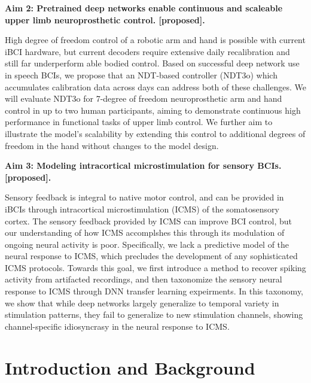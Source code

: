 \documentclass[12pt,oneside]{report}
\begin{document}
\textbf{Aim 2: Pretrained deep networks enable continuous and scaleable upper limb neuroprosthetic control. [proposed].}

High degree of freedom control of a robotic arm and hand is possible with current iBCI hardware, but current decoders require extensive daily recalibration and still far underperform able bodied control. Based on successful deep network use in speech BCIs, we propose that an NDT-based controller (NDT3o) which accumulates calibration data across days can address both of these challenges. We will evaluate NDT3o for 7-degree of freedom neuroprosthetic arm and hand control in up to two human participants, aiming to demonstrate continuous high performance in functional tasks of upper limb control. We further aim to illustrate the model’s scalability by extending this control to additional degrees of freedom in the hand without changes to the model design.

\textbf{Aim 3: Modeling intracortical microstimulation for sensory BCIs. [proposed].}

Sensory feedback is integral to native motor control, and can be provided in iBCIs through intracortical microstimulation (ICMS) of the somatosensory cortex. The sensory feedback provided by ICMS can improve BCI control, but our understanding of how ICMS accomplshes this through its modulation of ongoing neural activity is poor. Specifically, we lack a predictive model of the neural response to ICMS, which precludes the development of any sophisticated ICMS protocols. Towards this goal, we first introduce a method to recover spiking activity from artifacted recordings, and then taxonomize the sensory neural response to ICMS through DNN transfer learning expeirments. In this taxonomy, we show that while deep networks largely generalize to temporal variety in stimulation patterns, they fail to generalize to new stimulation channels, showing channel-specific idiosyncrasy in the neural response to ICMS.

\tableofcontents

\cleardoublepage
{}

\chapter{Introduction and Background}
\end{document}
